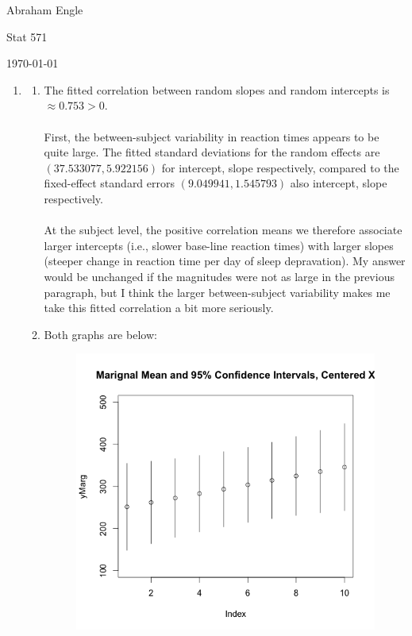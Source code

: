 \documentclass[11pt]{article}
\begin{document}
\pagestyle{empty}
\hfill Abraham Engle

\hfill Stat 571

\hfill \today
\begin{enumerate}
	\item 	
		\begin{enumerate}
		\item The fitted correlation between random slopes and random intercepts is $\approx 0.753>0$. 
		\\ \\First, the between-subject variability in reaction times appears to be quite large. The fitted standard deviations for the random effects are $(37.533077,5.922156)$ for intercept, slope respectively, compared to the fixed-effect standard errors $(9.049941,1.545793)$ also intercept, slope respectively.
		\\ \\ At the subject level, the positive correlation means we therefore associate larger intercepts (i.e., slower base-line reaction times) with larger slopes (steeper change in reaction time per day of sleep depravation). My answer would be unchanged if the magnitudes were not as large in the previous paragraph, but I think the larger between-subject variability makes me take this fitted correlation a bit more seriously.
		\item Both graphs are below:
		\begin{figure}[H]
			\includegraphics[scale=0.4]{Rplot1}

\end{figure}
\end{enumerate}
\end{enumerate}
\end{document}
